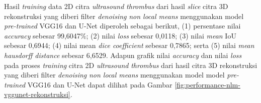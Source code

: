 \begin{enumerate}
	
	Hasil \textit{training} data 2D citra \textit{ultrasound} \textit{thrombus} dari hasil \textit{slice} citra 3D rekonstruksi yang diberi filter \textit{denoising} \textit{non local means} menggunakan model \textit{pre-trained} VGG16 dan U-Net diperoleh sebagai berikut, (1) persentase nilai \textit{accuracy} sebesar 99,6047\%; (2) nilai \textit{loss} sebesar 0,0118; (3) nilai \textit{mean} IoU sebesar 0,6944; (4) nilai mean \textit{dice coefficient} sebesar 0,7865; serta (5) nilai \textit{mean hausdorff distance} sebesar 6,6529. Adapun grafik nilai \textit{accuracy} dan nilai \textit{loss} pada proses \textit{training} citra 2D \textit{ultrasound} \textit{thrombus} dari hasil citra 3D rekonstruksi yang diberi filter \textit{denoising} \textit{non local means} menggunakan model model \textit{pre-trained} VGG16 dan U-Net dapat dilihat pada Gambar \ref{fig:performance-nlm-vggunet-rekonstruksi}.
	

\end{enumerate}
